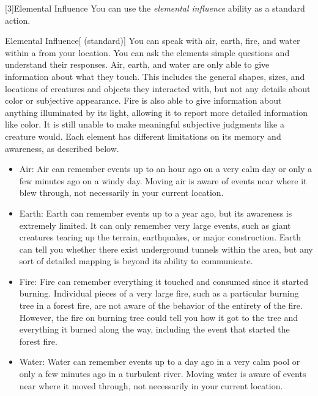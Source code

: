         [3]{Elemental Influence} You can use the \textit{elemental influence} ability as a standard action.
        \begin{freeability}{Elemental Influence}[ (standard)]
            You can speak with air, earth, fire, and water within a \areahuge {} from your location.
            You can ask the elements simple questions and understand their responses.
            Air, earth, and water are only able to give information about what they touch.
            This includes the general shapes, sizes, and locations of creatures and objects they interacted with, but not any details about color or subjective appearance.
            Fire is also able to give information about anything illuminated by its light, allowing it to report more detailed information like color.
            It is still unable to make meaningful subjective judgments like a creature would.
            Each element has different limitations on its memory and awareness, as described below.

            \begin{itemize}
                \item Air: Air can remember events up to an hour ago on a very calm day or only a few minutes ago on a windy day.
                    Moving air is aware of events near where it blew through, not necessarily in your current location.
                \item Earth: Earth can remember events up to a year ago, but its awareness is extremely limited.
                    It can only remember very large events, such as giant creatures tearing up the terrain, earthquakes, or major construction.
                    Earth can tell you whether there exist underground tunnels within the area, but any sort of detailed mapping is beyond its ability to communicate.
                \item Fire: Fire can remember everything it touched and consumed since it started burning.
                    Individual pieces of a very large fire, such as a particular burning tree in a forest fire, are not aware of the behavior of the entirety of the fire.
                    However, the fire on burning tree could tell you how it got to the tree and everything it burned along the way, including the event that started the forest fire.
                \item Water: Water can remember events up to a day ago in a very calm pool or only a few minutes ago in a turbulent river.
                    Moving water is aware of events near where it moved through, not necessarily in your current location.
            \end{itemize}
        \end{freeability}

